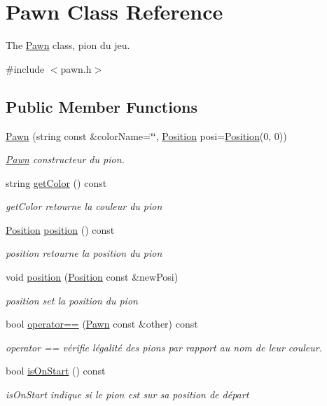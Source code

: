 \hypertarget{class_pawn}{}\section{Pawn Class Reference}
\label{class_pawn}


The \mbox{\hyperlink{class_pawn}{Pawn}} class, pion du jeu.  




{\ttfamily \#include $<$pawn.\+h$>$}

\subsection*{Public Member Functions}
\begin{DoxyCompactItemize}
\item 
\mbox{\hyperlink{class_pawn_aed538c943413933d765ce6e7a11e8cf8}{Pawn}} (string const \&color\+Name=\char`\"{}\char`\"{}, \mbox{\hyperlink{class_position}{Position}} posi=\mbox{\hyperlink{class_position}{Position}}(0, 0))
\begin{DoxyCompactList}\small\item\em \mbox{\hyperlink{class_pawn}{Pawn}} constructeur du pion. \end{DoxyCompactList}\item 
string \mbox{\hyperlink{class_pawn_a3608fc8df7d72f124ff2baa1fd1b6927}{get\+Color}} () const
\begin{DoxyCompactList}\small\item\em get\+Color retourne la couleur du pion \end{DoxyCompactList}\item 
\mbox{\hyperlink{class_position}{Position}} \mbox{\hyperlink{class_pawn_a917893aff236c2a13343ebda87c423e2}{position}} () const
\begin{DoxyCompactList}\small\item\em position retourne la position du pion \end{DoxyCompactList}\item 
void \mbox{\hyperlink{class_pawn_a6a8646ce4ad7aa5291544ffb1127783f}{position}} (\mbox{\hyperlink{class_position}{Position}} const \&new\+Posi)
\begin{DoxyCompactList}\small\item\em position set la position du pion \end{DoxyCompactList}\item 
bool \mbox{\hyperlink{class_pawn_a5fb75477bb2d47d0fdbb6e3b92d157cf}{operator==}} (\mbox{\hyperlink{class_pawn}{Pawn}} const \&other) const
\begin{DoxyCompactList}\small\item\em operator == vérifie l\textquotesingle{}égalité des pions par rapport au nom de leur couleur. \end{DoxyCompactList}\item 
bool \mbox{\hyperlink{class_pawn_a9758ec0052198a4afe983d9a5430736d}{is\+On\+Start}} () const
\begin{DoxyCompactList}\small\item\em is\+On\+Start indique si le pion est sur sa position de départ \end{DoxyCompactList}\end{DoxyCompactItemize}

